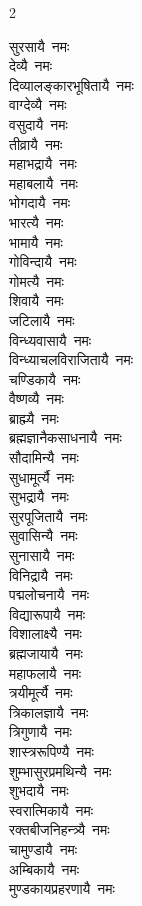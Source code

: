 \begin{multicols}{2}
\begin{flushleft}
सुरसायै~नमः\\
देव्यै~नमः\\
दिव्यालङ्कारभूषितायै~नमः\hfill{}\\
वाग्देव्यै~नमः\\
वसुदायै~नमः\\
तीव्रायै~नमः\\
महाभद्रायै~नमः\\
महाबलायै~नमः\\
भोगदायै~नमः\\
भारत्यै~नमः\\
भामायै~नमः\\
गोविन्दायै~नमः\\
गोमत्यै~नमः\hfill{}\\
शिवायै~नमः\\
जटिलायै~नमः\\
विन्ध्यवासायै~नमः\\
विन्ध्याचलविराजितायै~नमः\\
चण्डिकायै~नमः\\
वैष्णव्यै~नमः\\
ब्राह्म्यै~नमः\\
ब्रह्मज्ञानैकसाधनायै~नमः\\
सौदामिन्यै~नमः\\
सुधामूर्त्यै~नमः\hfill{}\\
सुभद्रायै~नमः\\
सुरपूजितायै~नमः\\
सुवासिन्यै~नमः\\
सुनासायै~नमः\\
विनिद्रायै~नमः\\
पद्मलोचनायै~नमः\\
विद्यारूपायै~नमः\\
विशालाक्ष्यै~नमः\\
ब्रह्मजायायै~नमः\\
महाफलायै~नमः\hfill{}\\
त्रयीमूर्त्यै~नमः\\
त्रिकालज्ञायै~नमः\\
त्रिगुणायै~नमः\\
शास्त्ररूपिण्यै~नमः\\
शुम्भासुरप्रमथिन्यै~नमः\\
शुभदायै~नमः\\
स्वरात्मिकायै~नमः\\
रक्तबीजनिहन्त्र्यै~नमः\\
चामुण्डायै~नमः\\
अम्बिकायै~नमः\hfill{}\\
मुण्डकायप्रहरणायै~नमः\\

\end{flushleft}
\end{multicols}
